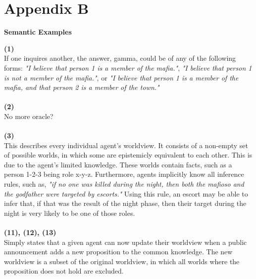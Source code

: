 \section*{Appendix B}\label{app:B}
\begin{center}
	\textbf{Semantic Examples}
\end{center}
\textbf{(1)} \\
If one inquires another, the answer, gamma, could be of any of the 
following forms: \textit{"I believe that person 1 is a member of the mafia."}, \textit{"I believe 
that person 1 is not a member of the mafia."}, or \textit{"I believe that person 1 is a 
member of the mafia, and that person 2 is a member of the town."}  \\ \\
\textbf{(2)} \\
No more oracle? \\ \\
\textbf{(3)} \\
This describes every individual agent's worldview. It consists of a 
non-empty set of possible worlds, in which some are epistemicly equivalent to 
each other. This is due to the agent's limited knowledge. These worlds contain facts, 
such as a person 1-2-3 being role x-y-z. Furthermore, agents implicitly know 
all inference rules, such as, \textit{"if no one was killed during the night, then both 
the mafioso and the godfather were targeted by escorts."} Using this rule, an 
escort may be able to infer that, if that was the result of the night phase, 
then their target during the night is very likely to be one of those roles.  \\ 
\\
\textbf{(11), (12), (13)} \\
Simply states that a given agent can now update their worldview when a public announcement adds a new proposition to the common knowledge. The new worldview is a subset of the original worldview, in which 
all worlds where the proposition does not hold are excluded. 

